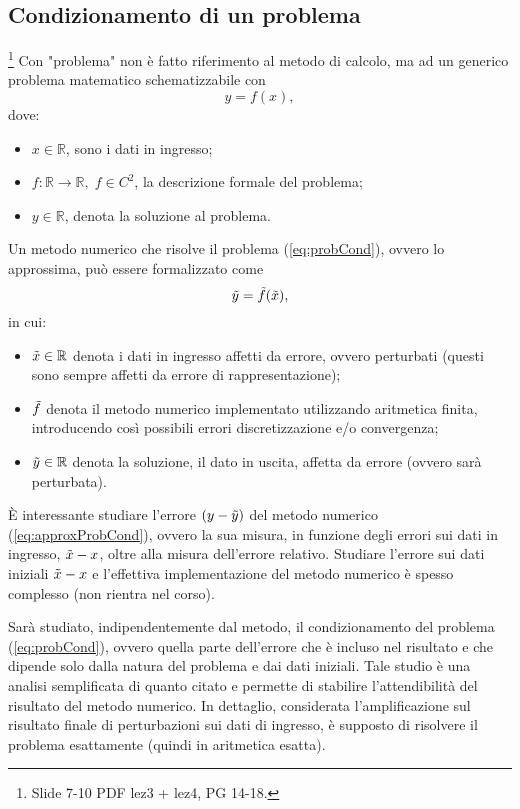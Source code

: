 \subsection{Condizionamento di un problema}\footnote{Slide 7-10 PDF lez3 + lez4, PG 14-18.}
Con "problema" non è fatto riferimento al metodo di calcolo, ma ad un generico problema matematico schematizzabile con 
\begin{equation}\label{eq:probCond}
	y=f(x),
\end{equation}
dove:
\begin{itemize}
	\item $x\in\mathbb R$, sono i dati in ingresso;
	\item $f:\mathbb R\rightarrow\mathbb R,\; f\in C^2$, la descrizione formale del problema;
	\item $y\in\mathbb R$, denota la soluzione al problema.
\end{itemize}

Un metodo numerico che risolve il problema (\ref{eq:probCond}), ovvero lo approssima, può essere formalizzato come
\begin{equation}\label{eq:approxProbCond}
	\Tilde{y}=\Tilde{f}(\Tilde{x}),
\end{equation}
in cui:
\begin{itemize}
	\item $\Tilde{x}\in\mathbb R$ denota i dati in ingresso affetti da errore, ovvero perturbati (questi sono sempre affetti da errore di rappresentazione);
	\item $\Tilde{f}$ denota il metodo numerico implementato utilizzando aritmetica finita, introducendo così possibili errori discretizzazione e/o convergenza;
	\item $\Tilde{y}\in\mathbb R$ denota la soluzione, il dato in uscita, affetta da errore (ovvero sarà perturbata). 
\end{itemize}

È interessante studiare l'errore $(y-\Tilde{y})$ del metodo numerico (\ref{eq:approxProbCond}), ovvero la sua misura, in funzione degli errori sui dati in ingresso, $\Tilde{x} - x$, oltre alla misura dell'errore relativo. Studiare l'errore sui dati iniziali $\Tilde{x} - x$ e l'effettiva implementazione del metodo numerico è spesso complesso (non rientra nel corso).

Sarà studiato, indipendentemente dal metodo, il condizionamento del problema (\ref{eq:probCond}), ovvero quella parte dell'errore che è incluso nel risultato e che dipende solo dalla natura del problema e dai dati iniziali. Tale studio è una analisi semplificata di quanto citato e permette di stabilire l'attendibilità del risultato del metodo numerico. In dettaglio, considerata l'amplificazione sul risultato finale di perturbazioni sui dati di ingresso, è supposto di risolvere il problema esattamente (quindi in aritmetica esatta).


